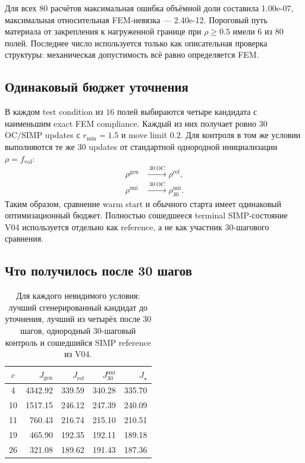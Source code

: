 Для всех $80$ расчётов максимальная ошибка объёмной доли составила 1.00e-07, максимальная относительная FEM-невязка --- 2.40e-12. Пороговый путь материала от закрепления к нагруженной границе при $\rho\ge 0.5$ имели 6 из $80$ полей. Последнее число используется только как описательная проверка структуры: механическая допустимость всё равно определяется FEM.

\subsection{Одинаковый бюджет уточнения}
\label{subsec:practical-v08-budget}

В каждом test condition из $16$ полей выбираются четыре кандидата с наименьшим exact FEM compliance. Каждый из них получает ровно $30$ OC/SIMP updates с $r_{\min}=1.5$ и move limit $0.2$. Для контроля в том же условии выполняются те же $30$ updates от стандартной однородной инициализации $\rho=f_{\mathrm{vol}}$:
\begin{equation}
\label{eq:practical-v08-fixed-budget}
 \begin{aligned}
  \rho^{\mathrm{gen}}
  &\xrightarrow{\ 30\ \mathrm{OC}\ }
  \rho^{\mathrm{ref}},
  \\
  \rho^{\mathrm{uni}}
  &\xrightarrow{\ 30\ \mathrm{OC}\ }
  \rho_{30}^{\mathrm{uni}}.
 \end{aligned}
\end{equation}
Таким образом, сравнение warm start и обычного старта имеет одинаковый оптимизационный бюджет. Полностью сошедшееся terminal SIMP-состояние V04 используется отдельно как reference, а не как участник 30-шагового сравнения.

\subsection{Что получилось после 30 шагов}
\label{subsec:practical-v08-results}

\begin{table}[ht]
 \centering
 \small
 \begin{tabular}{c|r|r|r|r}
  $c$ & $J_{\mathrm{gen}}$ & $J_{\mathrm{ref}}$ & $J_{30}^{\mathrm{uni}}$ & $J_{\star}$\\
  \hline
  4 & 4342.92 & 339.59 & 340.28 & 335.70\\
  10 & 1517.15 & 246.12 & 247.39 & 240.09\\
  11 & 760.43 & 216.74 & 215.10 & 210.51\\
  19 & 465.90 & 192.35 & 192.11 & 189.18\\
  26 & 321.08 & 189.62 & 191.43 & 187.36\\
 \end{tabular}
 \caption{Для каждого невидимого условия: лучший сгенерированный кандидат до уточнения, лучший из четырёх после $30$ шагов, однородный $30$-шаговый контроль и сошедшийся SIMP reference из V04.}
 \label{tab:practical-v08-compliance}
\end{table}

